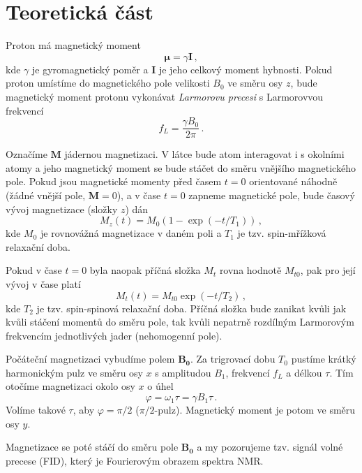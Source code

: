 \section*{Teoretická část}
Proton má magnetický moment
\begin{equation}
\bm{\mu}=\gamma\bm{I}\,,
\end{equation}
kde $\gamma$ je gyromagnetický poměr a $\bm{I}$ je jeho celkový moment hybnosti.
Pokud proton umístíme do magnetického pole velikosti $B_0$ ve směru osy $z$, bude magnetický moment protonu vykonávat \emph{Larmorovu precesi} s Larmorovvou frekvencí \cite{skripta}
\begin{equation} \label{e:fL}
f_L=\frac{\gamma B_0}{2\pi} \,.
\end{equation}

Označíme $\bm{M}$ jádernou magnetizaci.
V látce bude atom interagovat i s okolními atomy a jeho magnetický moment se bude stáčet do směru vnějšího magnetického pole. Pokud jsou magnetické momenty před časem $t=0$ orientované náhodně (žádné vnější pole, $\bm{M}=0$), a v čase $t=0$ zapneme magnetické pole, bude časový vývoj magnetizace (složky $z$) dán \cite{skripta}
\begin{equation} \label{e:mz}
M_z(t)=M_0 (1-\exp(-t/T_1)) \,,
\end{equation}
kde $M_0$ je rovnovážná magnetizace v daném poli a $T_1$ je tzv. spin-mřížková relaxační doba.

Pokud v čase $t=0$ byla naopak příčná složka $M_t$ rovna hodnotě $M_{t0}$, pak pro její vývoj v čase platí \cite{skripta}
\begin{equation} \label{e:mt}
M_t(t)=M_{t0} \exp(-t/T_2) \,,
\end{equation}
kde $T_2$ je tzv. spin-spinová relaxační doba. Příčná složka bude zanikat kvůli jak kvůli stáčení momentů do směru pole, tak kvůli nepatrně rozdílným Larmorovým frekvencím jednotlivých jader (nehomogenní pole).

Počáteční magnetizaci vybudíme polem $\bm{B_0}$. Za trigrovací dobu $T_0$ pustíme krátký harmonickým pulz ve směru osy $x$ s amplitudou $B_1$, frekvencí $f_L$ a délkou $\tau$. Tím otočíme magnetizaci okolo osy $x$ o úhel \cite{skripta}
\begin{equation} \label{e:uhel}
\varphi=\omega_1\tau=\gamma B_1 \tau \,.
\end{equation}
Volíme takové $\tau$, aby $\varphi=\pi/2$ ($\pi/2$-pulz). Magnetický moment je potom ve směru osy $y$.

Magnetizace se poté stáčí do směru pole $\bm{B_0}$ a my pozorujeme tzv. signál volné precese (FID), který je Fourierovým obrazem spektra NMR.

